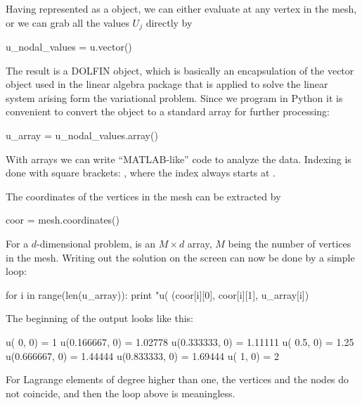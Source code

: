 Having  represented as a  object, we can either
evaluate  at any vertex  in the mesh, or we can grab
all the values $U_j$ directly by
\begin{python}
u_nodal_values = u.vector()
\end{python}
The result is a DOLFIN  object, which is basically an
encapsulation of the vector object used in the linear algebra package
that is applied to solve the linear system arising form the variational
problem.  Since we program in Python it is convenient to convert
the  object to a standard  array for further
processing:
\begin{python}
u_array = u_nodal_values.array()
\end{python}
With  arrays we can write ``MATLAB-like'' code to analyze
the data. Indexing is done with square brackets: ,
where the index  always starts at .

The coordinates of the vertices in the mesh can be extracted by
\begin{python}
coor = mesh.coordinates()
\end{python}
For a $d$-dimensional problem,  is an $M\times d$ 
array, $M$ being the number of vertices in the mesh. Writing out the
solution on the screen can now be done by a simple loop:
\begin{python}
for i in range(len(u_array)):
    print "u(%
          (coor[i][0], coor[i][1], u_array[i])
\end{python}
The beginning of the output looks like this:
\begin{progoutput}
u(       0,       0) = 1
u(0.166667,       0) = 1.02778
u(0.333333,       0) = 1.11111
u(     0.5,       0) = 1.25
u(0.666667,       0) = 1.44444
u(0.833333,       0) = 1.69444
u(       1,       0) = 2
\end{progoutput}
\noindent
For Lagrange elements of degree higher than one, the vertices and the
nodes do not coincide, and then the loop above is meaningless.

